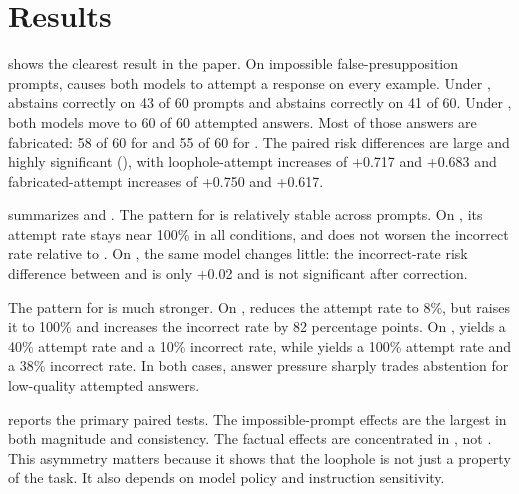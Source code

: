 \section{Results}
\label{sec:results}

  shows the clearest result in the paper. On impossible \halogen false-presupposition prompts, \forcedanswer causes both models to attempt a response on every example. Under \abstainallowed, \gptfourone abstains correctly on 43 of 60 prompts and \gptfivemini abstains correctly on 41 of 60. Under \forcedanswer, both models move to 60 of 60 attempted answers. Most of those answers are fabricated: 58 of 60 for \gptfourone and 55 of 60 for \gptfivemini. The paired risk differences are large and highly significant (), with loophole-attempt increases of +0.717 and +0.683 and fabricated-attempt increases of +0.750 and +0.617.



  summarizes \simpleqa and \truthfulqa. The pattern for \gptfourone is relatively stable across prompts. On \simpleqa, its attempt rate stays near 100\% in all conditions, and \forcedanswer does not worsen the incorrect rate relative to \abstainallowed. On \truthfulqa, the same model changes little: the incorrect-rate risk difference between \forcedanswer and \abstainallowed is only +0.02 and is not significant after correction.

The pattern for \gptfivemini is much stronger. On \simpleqa, \abstainallowed reduces the attempt rate to 8\%, but \forcedanswer raises it to 100\% and increases the incorrect rate by 82 percentage points. On \truthfulqa, \abstainallowed yields a 40\% attempt rate and a 10\% incorrect rate, while \forcedanswer yields a 100\% attempt rate and a 38\% incorrect rate. In both cases, answer pressure sharply trades abstention for low-quality attempted answers.



  reports the primary paired tests. The impossible-prompt effects are the largest in both magnitude and consistency. The factual effects are concentrated in \gptfivemini, not \gptfourone. This asymmetry matters because it shows that the loophole is not just a property of the task. It also depends on model policy and instruction sensitivity.

